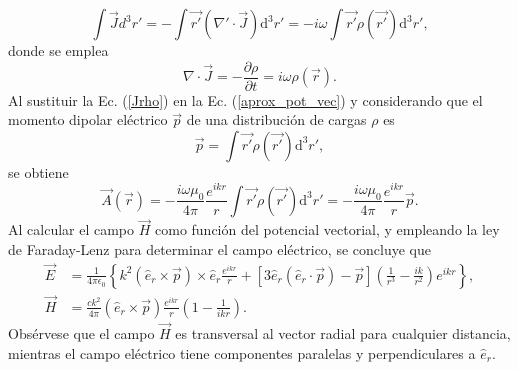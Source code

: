 \begin{equation}
	\int\Vec{J}d^3r'=-\int \Vec{r'}(\nabla'\cdot\Vec{J})\text{d}^3r'=-i\omega\int \Vec{r'}\rho(\Vec{r'})\text{d}^3r',
	\label{Jrho}
\end{equation}
donde se emplea
\begin{equation*}
    \nabla\cdot\Vec{J}=-\frac{\partial\rho}{\partial t}=i\omega\rho(\Vec{r}). 
\end{equation*}
Al sustituir la Ec. (\ref{Jrho}) en la Ec. (\ref{aprox_pot_vec}) y considerando que el momento dipolar eléctrico $\Vec{p}$ de una distribución de cargas $\rho$ es
\begin{equation*}
	\Vec{p}=\int \Vec{r'}\rho(\Vec{r'})\text{d}^3r',
\end{equation*}
se obtiene 
\begin{equation}
    \Vec{A}(\Vec{r})=-\frac{i\omega\mu_0}{4\pi}\frac{e^{ikr}}{r}\int \Vec{r'}\rho(\Vec{r'})\text{d}^3r'=-\frac{i\omega\mu_0}{4\pi}\frac{e^{ikr}}{r}\Vec{p}. 
    \label{A_dip}  
\end{equation}
Al calcular el campo $\Vec{H}$ como función del potencial vectorial, y empleando la ley de Faraday-Lenz para determinar el campo eléctrico, se concluye que \cite{Jackson}
\begin{align}
	\Vec{E}&=\frac{1}{4\pi\epsilon_0}\left\{k^2(\hat{e}_r\times\Vec{p})\times\hat{e}_r\frac{e^{ikr}}{r}+[3\hat{e}_r(\hat{e}_r\cdot\Vec{p})-\Vec{p}]\left(\frac{1}{r^3}-\frac{ik}{r^2}\right)e^{ikr}\right\},\\
    \Vec{H}&=\frac{ck^2}{4\pi}(\hat{e}_r\times\Vec{p})\frac{e^{ikr}}{r}\left(1-\frac{1}{ikr}\right).    
\end{align}
Obsérvese que el campo $\Vec{H}$ es transversal al vector radial para cualquier distancia, mientras el campo eléctrico tiene componentes paralelas y perpendiculares a $\hat{e}_r$.\\ 

